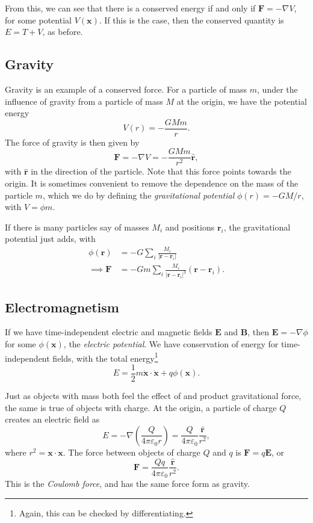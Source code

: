 \documentclass[11pt, a4paper]{scrartcl}
\newcommand{\vv}[1]{\boldsymbol{\mathbf{#1}}}
\theoremstyle{definition}
\newcommand{\hh}[1]{\hat{\vv{#1}}}
\begin{document}
From this, we can see that there is a conserved energy if and only if $\vv F = - \nabla V$, for some potential $V(\vv x)$. If this is the case, then the conserved quantity is $E = T + V$, as before.

\subsection*{Gravity}

Gravity is an example of a conserved force. For a particle of mass $m$, under the influence of gravity from a particle of mass $M$ at the origin, we have the potential energy
$$
V(r) = -\frac{GMm}{r}.
$$
The force of gravity is then given by
$$
\vv F = - \nabla V = -\frac{G Mm}{r^2} \hh r,
$$
with $\hh r$ in the direction of the particle. Note that this force points towards the origin.
It is sometimes convenient to remove the dependence on the mass of the particle $m$, which we do by defining the \emph{gravitational potential} $\phi(r) = -GM/r$, with $V = \phi m$.

If there is many particles say of masses $M_i$ and positions $\vv r_i$, the gravitational potential just adds, with 
\begin{align*}
	\phi(\vv r) &= -G \sum_i \frac{M_i}{|\vv r - \vv r_i|} \\
\implies \vv F &= -Gm \sum_i \frac{M_i}{|\vv r - \vv r_i|^3} (\vv r - \vv r_i).
\end{align*}

\subsection*{Electromagnetism}

If we have time-independent electric and magnetic fields $\vv E$ and $\vv B$, then $\vv E = - \nabla \phi$ for some $\phi(\vv x)$, the \emph{electric potential}. We have conservation of energy for time-independent fields, with the total energy\footnote{Again, this can be checked by differentiating.}
$$
E = \frac{1}{2}m \dot{\vv x} \cdot \dot{\vv x} + q \phi(\vv x). 
$$

Just as objects with mass both feel the effect of and product gravitational force, the same is true of objects with charge. At the origin, a particle of charge $Q$ creates an electric field as
$$
E = - \nabla \left(\frac{Q}{4 \pi \varepsilon_0 r}\right) = \frac{Q}{4 \pi \varepsilon_0} \frac{\hh r}{r^2},
$$
where $r^2 = \vv x \cdot \vv x$. The force between objects of charge $Q$ and $q$ is $\vv F = q \vv E$, or
$$
\vv F = \frac{Qq}{4 \pi \varepsilon_0} \frac{\hh r}{r^2}.
$$
This is the \emph{Coulomb force}, and has the same force form as gravity.
\end{document}
